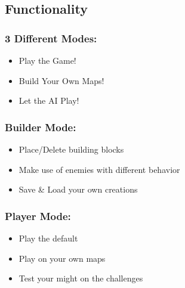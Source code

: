 \documentclass{beamer}
\begin{document}
\subsection{Functionality}
\begin{frame}
    \frametitle{3 Different Modes:}
    \large
    \begin{itemize}
        \item Play the Game!
        \item Build Your Own Maps!
        \item Let the AI Play!
    \end{itemize}
\end{frame}

\begin{frame}
    \frametitle{Builder Mode:}    
    \begin{itemize}
        \item Place/Delete building blocks
        \item Make use of enemies with different behavior
        \item Save \& Load your own creations
    \end{itemize}
\end{frame}
\begin{frame}
    \frametitle{Player Mode:}    
    \begin{itemize}
        \item Play the default
        \item Play on your own maps
        \item Test your might on the challenges
    \end{itemize}
\end{frame}
\end{document}
